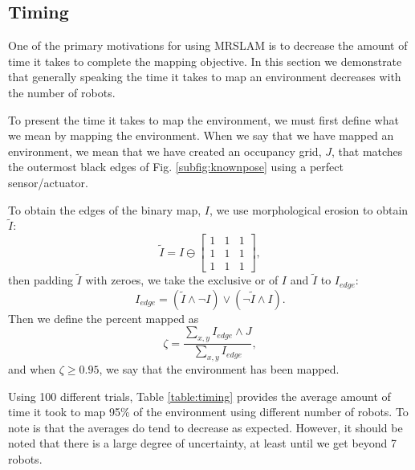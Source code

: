 \subsection{Timing}
\label{S:Exp:Timing}

One of the primary motivations for using MRSLAM is to decrease the amount of time it takes to complete the mapping objective.  In this section we demonstrate that generally speaking the time it takes to map an environment decreases with the number of robots.  

To present the time it takes to map the environment, we must first define what we mean by mapping the environment.  When we say that we have mapped an environment, we mean that we have created an occupancy grid, $J$, that matches the outermost black edges of Fig. \ref{subfig:knownpose} using a perfect sensor/actuator.  

To obtain the edges of the binary map, $I$, we use morphological erosion to obtain $\tilde{I}$:
\begin{equation}
\tilde{I}=I\ominus \begin{bmatrix}
1 & 1 & 1 \\
1 & 1 & 1 \\
1 & 1 & 1
\end{bmatrix},
\end{equation}
then padding $\tilde{I}$ with zeroes, we take the exclusive or of $I$ and $\tilde{I}$ to $I_{edge}$:
\begin{equation}
I_{edge}=(\tilde{I}\wedge \neg I)\vee (\neg \tilde{I}\wedge I).
\end{equation}
Then we define the percent mapped as
\begin{equation}
\zeta =\frac{\sum_{x,y}I_{edge}\wedge J}{\sum_{x,y}I_{edge}},
\end{equation}
and when $\zeta\geq 0.95$, we say that the environment has been mapped.

Using 100 different trials, Table \ref{table:timing} provides the average amount of time it took to map 95\% of the environment using different number of robots.  To note is that the averages do tend to decrease as expected.  However, it should be noted that there is a large degree of uncertainty, at least until we get beyond 7 robots.  

